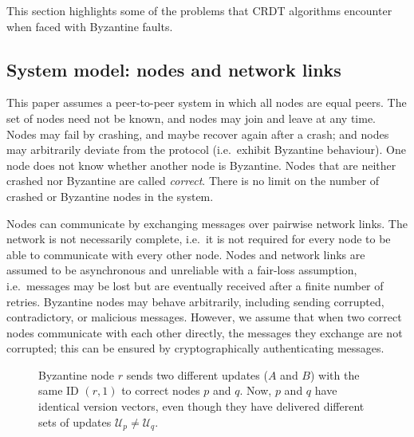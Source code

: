 \documentclass[sigplan,review]{acmart}
\begin{document}
This section highlights some of the problems that CRDT algorithms encounter when faced with Byzantine faults.

\subsection{System model: nodes and network links}\label{sec:system-model}

This paper assumes a peer-to-peer system in which all nodes are equal peers.
The set of nodes need not be known, and nodes may join and leave at any time.
Nodes may fail by crashing, and maybe recover again after a crash; and nodes may arbitrarily deviate from the protocol (i.e.\ exhibit Byzantine behaviour).
One node does not know whether another node is Byzantine.
Nodes that are neither crashed nor Byzantine are called \emph{correct}.
There is no limit on the number of crashed or Byzantine nodes in the system.

Nodes can communicate by exchanging messages over pairwise network links.
The network is not necessarily complete, i.e.\ it is not required for every node to be able to communicate with every other node.
Nodes and network links are assumed to be asynchronous and unreliable with a fair-loss assumption, i.e.\ messages may be lost but are eventually received after a finite number of retries.
Byzantine nodes may behave arbitrarily, including sending corrupted, contradictory, or malicious messages.
However, we assume that when two correct nodes communicate with each other directly, the messages they exchange are not corrupted; this can be ensured by cryptographically authenticating messages.

\begin{figure*}
\centering
{}
\caption{Byzantine node $r$ sends two different updates ($A$ and $B$) with the same ID $(r,1)$ to correct nodes $p$ and $q$. Now, $p$ and $q$ have identical version vectors, even though they have delivered different sets of updates $\mathcal{U}_p \ne \mathcal{U}_q$.}
\label{fig:version-vectors}
\end{figure*}
\end{document}

